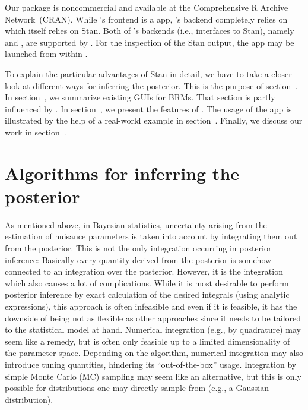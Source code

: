Our  package is noncommercial and available at the
Comprehensive R Archive Network~(CRAN). While 's frontend
is a  \citep{chang_shiny_2021} app, 's backend
completely relies on  \citep{burkner_brms:_2017,
burkner_advanced_2018} which itself relies on Stan. Both of 's
backends (i.e., interfaces to Stan), namely 
\citep{stan_development_team_rstan_2020} and 
\citep{gabry_cmdstanr_2020}, are supported by . For the
inspection of the Stan output, the 
\citep{gabry_shinystan_2018} app may be launched from within .

To explain the particular advantages of Stan in detail, we have to take a closer
look at different ways for inferring the posterior. This is the purpose of
section~. In section~, we summarize existing GUIs for
BRMs. That section is partly influenced by \citet{ramirez-hassan_guided_2021}.
In section~, we present the features of . The
usage of the  app is illustrated by the help of a real-world
example in section~. Finally, we discuss our work in
section~.

\section{Algorithms for inferring the posterior}
\label{algos}

As mentioned above, in Bayesian statistics, uncertainty arising from the
estimation of nuisance parameters is taken into account by integrating them
out from the posterior. This is not the only integration occurring in
posterior inference: Basically every quantity derived from the posterior is
somehow connected to an integration over the posterior. However, it is the
integration which also causes a lot of complications. While it is most
desirable to perform posterior inference by exact calculation of the desired
integrals (using analytic expressions), this approach is often infeasible and
even if it is feasible, it has the downside of being not as flexible as other
approaches since it needs to be tailored to the statistical model at hand.
Numerical integration (e.g., by quadrature) may seem like a remedy, but is
often only feasible up to a limited dimensionality of the parameter space.
Depending on the algorithm, numerical integration may also introduce tuning
quantities, hindering its ``out-of-the-box'' usage.
Integration by simple Monte Carlo (MC) sampling may seem like an alternative,
but this is only possible for distributions one may directly sample from
(e.g., a Gaussian distribution).

